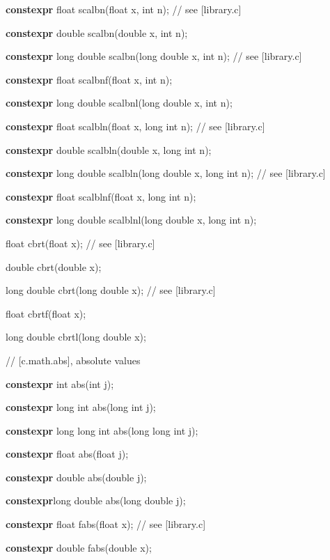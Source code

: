 \documentclass[prd,preprint,amsmath,amssymb,nofootinbib,eqsecnum]{revtex4-1}
\newcommand{\highlight}[1]{{\bf #1}}
\begin{document}
{\highlight{constexpr} float scalbn(float x, int n); // see [library.c]

\highlight{constexpr} double scalbn(double x, int n);

\highlight{constexpr} long double scalbn(long double x, int n); // see [library.c]

\highlight{constexpr} float scalbnf(float x, int n);

\highlight{constexpr} long double scalbnl(long double x, int n);

\vspace{2ex}

\highlight{constexpr} float scalbln(float x, long int n); // see [library.c]

\highlight{constexpr} double scalbln(double x, long int n);

\highlight{constexpr} long double scalbln(long double x, long int n); // see [library.c]

\highlight{constexpr} float scalblnf(float x, long int n);

\highlight{constexpr} long double scalblnl(long double x, long int n);

\vspace{2ex}

float cbrt(float x); // see [library.c]

double cbrt(double x);

long double cbrt(long double x); // see [library.c]

float cbrtf(float x);

long double cbrtl(long double x);

\vspace{2ex}

//  [c.math.abs], absolute values

\highlight{constexpr} int abs(int j);

\highlight{constexpr} long int abs(long int j);

\highlight{constexpr} long long int abs(long long int j);

\highlight{constexpr} float abs(float j);

\highlight{constexpr} double abs(double j);

\highlight{constexpr}long double abs(long double j);

\vspace{2ex}

\highlight{constexpr} float fabs(float x); // see [library.c]

\highlight{constexpr} double fabs(double x);

}
\end{document}
